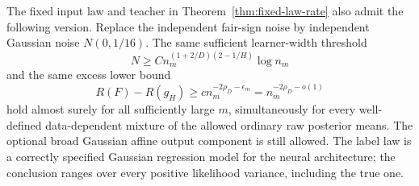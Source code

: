 \begin{corollary}
\label{cor:gaussian-noise-rate}
The fixed input law and teacher in Theorem~\ref{thm:fixed-law-rate} also admit the following version. Replace the independent fair-sign noise by independent Gaussian noise $N(0,1/16)$. The same sufficient learner-width threshold
\[
 N\ge C n_m^{(1+2/D)(2-1/H)}\log n_m
\]
and the same excess lower bound
\[
 R(F)-R(g_H)\ge c n_m^{-2\rho_D-\epsilon_m}
                 =n_m^{-2\rho_D-o(1)}
\]
hold almost surely for all sufficiently large $m$, simultaneously for every well-defined data-dependent mixture of the allowed ordinary raw posterior means. The optional broad Gaussian affine output component is still allowed. The label law is a correctly specified Gaussian regression model for the neural architecture; the conclusion ranges over every positive likelihood variance, including the true one.
\end{corollary}
